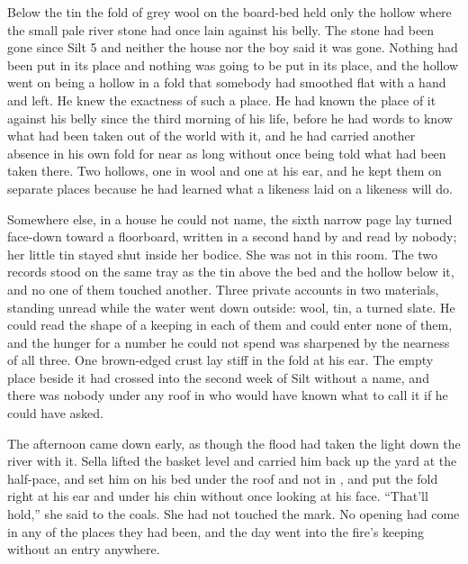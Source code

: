 Below the tin the fold of grey wool on the board-bed held only the hollow where the small pale river stone had once lain against his belly. The stone had been gone since Silt 5 and neither the house nor the boy said it was gone. Nothing had been put in its place and nothing was going to be put in its place, and the hollow went on being a hollow in a fold that somebody had smoothed flat with a hand and left. He knew the exactness of such a place. He had known the place of it against his belly since the third morning of his life, before he had words to know what had been taken out of the world with it, and he had carried another absence in his own fold for near as long without once being told what had been taken there. Two hollows, one in wool and one at his ear, and he kept them on separate places because he had learned what a likeness laid on a likeness will do.

Somewhere else, in a house he could not name, the sixth narrow page lay turned face-down toward a floorboard, written in a second hand by  and read by nobody; her little tin stayed shut inside her bodice. She was not in this room. The two records stood on the same tray as the tin above the bed and the hollow below it, and no one of them touched another. Three private accounts in two materials, standing unread while the water went down outside: wool, tin, a turned slate. He could read the shape of a keeping in each of them and could enter none of them, and the hunger for a number he could not spend was sharpened by the nearness of all three. One brown-edged crust lay stiff in the fold at his ear. The empty place beside it had crossed into the second week of Silt without a name, and there was nobody under any roof in  who would have known what to call it if he could have asked.

\scenebreak

The afternoon came down early, as though the flood had taken the light down the river with it. Sella lifted the basket level and carried him back up the yard at the half-pace, and set him on his bed under the roof and not in , and put the fold right at his ear and under his chin without once looking at his face. “That'll hold,” she said to the coals. She had not touched the mark. No opening had come in any of the places they had been, and the day went into the fire's keeping without an entry anywhere.

